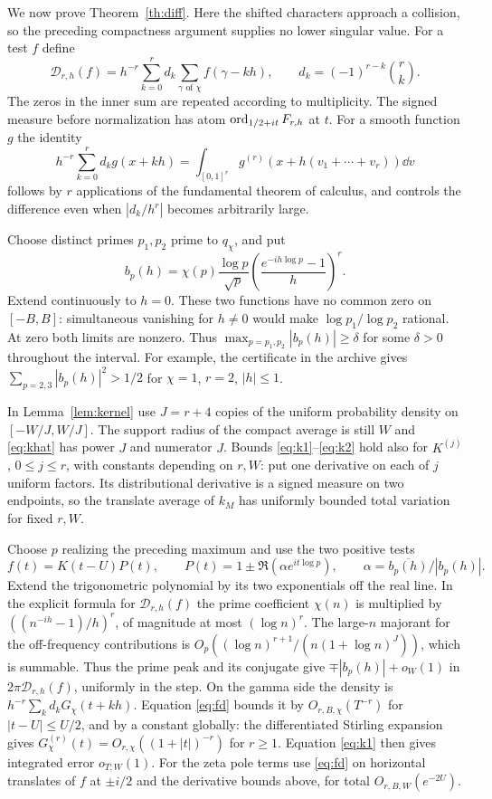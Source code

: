 We now prove Theorem~\ref{th:diff}. Here the shifted characters approach
a collision, so the preceding compactness argument supplies no lower
singular value. For a test $f$ define
\[
 \mathcal D_{r,h}(f)=h^{-r}\sum_{k=0}^r d_k
             \sum_{\gamma\text{ of }\chi} f(\gamma-kh),\qquad
             d_k=(-1)^{r-k}\binom rk .
\]
The zeros in the inner sum are repeated according to multiplicity.
The signed measure before normalization has atom $\operatorname{ord}_{1/2+it}F_{r,h}$ at $t$.
For a smooth function $g$ the identity
\begin{equation}
 h^{-r}\sum_{k=0}^r d_k g(x+kh)
 =\int_{[0,1]^r}g^{(r)}(x+h(v_1+\cdots+v_r))\dd v
 \label{eq:fd}
\end{equation}
follows by $r$ applications of the fundamental theorem of calculus,
and controls the difference even when $|d_k/h^r|$ becomes arbitrarily large.

Choose distinct primes $p_1,p_2$ prime to $q_\chi$, and put
\[
 b_p(h)=\chi(p)\frac{\log p}{\sqrt p}
       \left(\frac{e^{-ih\log p}-1}{h}\right)^r .
\]
Extend continuously to $h=0$. These two functions have no common zero
on $[-B,B]$: simultaneous vanishing for $h\ne0$ would make
$\log p_1/\log p_2$ rational. At zero both limits are nonzero. Thus
$\max_{p=p_1,p_2}|b_p(h)|\ge\delta$ for some $\delta>0$ throughout the interval.
For example, the certificate in the archive gives
$\sum_{p=2,3}|b_p(h)|^2>1/2$ for $\chi=1$, $r=2$, $|h|\le1$.

In Lemma~\ref{lem:kernel} use $J=r+4$ copies of the uniform probability
density on $[-W/J,W/J]$. The support radius of the compact average is still
$W$ and \eqref{eq:khat} has power $J$ and numerator $J$. Bounds
\eqref{eq:k1}--\eqref{eq:k2} hold also for $K^{(j)}$, $0\le j\le r$,
with constants depending on $r,W$: put one derivative on each of $j$
uniform factors. Its distributional derivative is a signed measure on
two endpoints, so the translate average of $k_M$ has uniformly
bounded total variation for fixed $r,W$.

Choose $p$ realizing the preceding maximum and use the two positive tests
\[
 f(t)=K(t-U)P(t),\qquad
 P(t)=1\pm\Re(\alpha e^{it\log p}),\qquad
 \alpha=\overline{b_p(h)}/|b_p(h)|.
\]
Extend the trigonometric polynomial by its two exponentials off the real line.
In the explicit formula for $\mathcal D_{r,h}(f)$ the prime coefficient
$\chi(n)$ is multiplied by $((n^{-ih}-1)/h)^r$, of magnitude at most
$(\log n)^r$. The large-$n$ majorant for the off-frequency contributions is
$O_p((\log n)^{r+1}/(n(1+\log n)^J))$, which is summable.
Thus the prime peak and its conjugate give
$\mp |b_p(h)|+o_W(1)$ in $2\pi\mathcal D_{r,h}(f)$, uniformly in the step.
On the gamma side the density is $h^{-r}\sum_k d_k G_\chi(t+kh)$.
Equation \eqref{eq:fd} bounds it by $O_{r,B,\chi}(T^{-r})$ for
$|t-U|\le U/2$, and by a constant globally: the differentiated Stirling
expansion gives $G_\chi^{(r)}(t)=O_{r,\chi}((1+|t|)^{-r})$ for $r\ge1$.
Equation \eqref{eq:k1} then gives integrated error $o_{T;W}(1)$.
For the zeta pole terms use \eqref{eq:fd} on horizontal translates of
$f$ at $\pm i/2$ and the derivative bounds above, for total
$O_{r,B,W}(e^{-2U})$.

